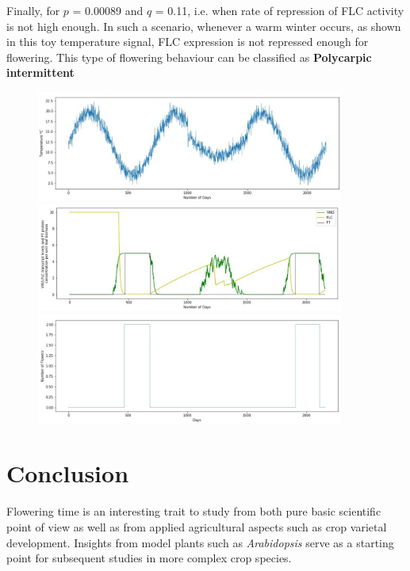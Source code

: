 \documentclass[10 pt]{article}
\begin{document}
Finally, for $p$ = 0.00089 and $q$ = 0.11, i.e. when rate of repression of FLC activity is not high enough. In such a scenario, whenever a warm winter occurs, as shown in this toy temperature signal, FLC expression is not repressed enough for flowering. This type of flowering behaviour can be classified as \textbf{Polycarpic intermittent}

\begin{figure}[h]
\includegraphics[width=0.9\textwidth]{polycarpic-intermittent-Temp.png}
\includegraphics[width=0.9\textwidth]{polycarpic-intermittent-vin-flc.png}
\includegraphics[width=0.9\textwidth]{polycarpic-intermittent-flowering.png}
\end{figure}


\section{Conclusion}

Flowering time is an interesting trait to study from both pure basic scientific point of view as well as from applied agricultural aspects such as crop varietal development. Insights from model plants such as \textit{Arabidopsis} serve as a starting point for subsequent studies in more complex crop species.
\end{document}
